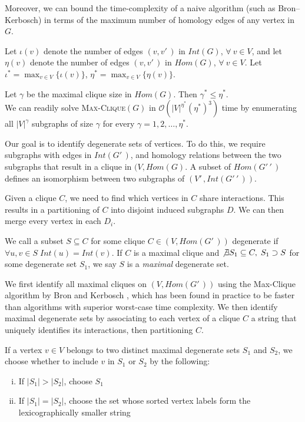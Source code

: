 \documentclass[12pt,twoside]{article}
\def\NI{\noindent}
\begin{document}
\NI Moreover, we can bound the time-complexity of a naive algorithm (such as Bron--Kerbosch) in terms of the maximum number of homology edges of any vertex in $G$.

\NI Let $\iota(v)$ denote the number of edges $(v, v'\,\!)$ in $Int(G)$, $\forall \: v \in V$, and let $\eta(v)$ denote the number of edges $(v, v'\,\!)$ in $Hom(G)$, $\forall \: v \in V$. Let $\iota^* = \displaystyle \max_{v \in V}\{\iota(v)\}$, $\eta^* = \displaystyle \max_{v \in V}\{\eta(v)\}$.

\NI Let $\gamma$ be the maximal clique size in $Hom(G)$. Then $\gamma^* \leq \eta^*$.\\
\NI We can readily solve \textsc{Max-Clique}$(G)$ in $\mathcal O(|V|^{\eta^*}(\eta^*)^3)$ time by enumerating all $|V|^{\gamma}$ subgraphs of size $\gamma$ for every $\gamma = 1, 2, \ldots, \eta^*$.

\NI Our goal is to identify degenerate sets of vertices. To do this, we require subgraphs with edges in $Int(G'\,\!)$, and homology relations between the two subgraphs that result in a clique in $(V,Hom(G)$. A subset of $Hom(G'\,\!'\,\!)$ defines an isomorphism between two subgraphs of $(V'\,\!, Int(G'\,\!'\,\!))$.

\NI Given a clique $C$, we need to find which vertices in $C$ share interactions. This results in a partitioning of $C$ into disjoint induced subgraphs $D$. We can then merge every vertex in each $D_i$.

\NI We call a subset $S \subseteq C$ for some clique $C \in (V,Hom(G'\,\!))$ degenerate if $\forall u,v \in S \; Int(u) = Int(v)$. If $C$ is a maximal clique and $\not \exists S_1 \subseteq C, \; S_1 \supset S$ for some degenerate set $S_1$, we say $S$ is a \emph{maximal} degenerate set.

\NI We first identify all maximal cliques on $(V,Hom(G'\,\!))$ using the {Max-Clique} algorithm by Bron and Kerbosch \cite{bron}, which has been found in practice to be faster than algorithms with superior worst-case time complexity. We then identify maximal degenerate sets by associating to each vertex of a clique $C$ a string that uniquely identifies its interactions, then partitioning $C$.

\NI If a vertex $v \in V$ belongs to two distinct maximal degenerate sets $S_1$ and $S_2$, we choose whether to include $v$ in $S_1$ or $S_2$ by the following:
\begin{enumerate}[i)]
\item If $|S_1| > |S_2|$, choose $S_1$
\item If $|S_1| = |S_2|$, choose the set whose sorted vertex labels form the lexicographically smaller string
\end{enumerate}
\end{document}
